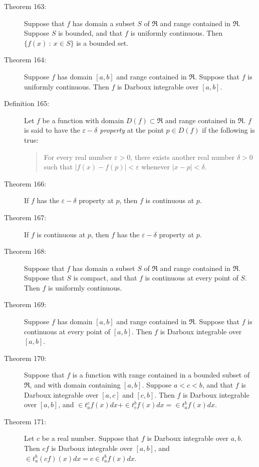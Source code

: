 \documentclass{article}
\begin{document}
\begin{description}
  \item[Theorem 163:] Suppose that $f$ has domain a subset $S$ of $\Re$ and range contained in $\Re$. Suppose $S$ is bounded, and that $f$ is uniformly continuous. Then $\{ f(x)\ :\ x \in S \}$ is a bounded set. 

  \item[Theorem 164:] Suppose $f$ has domain $[a,b]$ and range contained in $\Re$. Suppose that $f$ is uniformly continuous. Then $f$ is Darboux integrable over $[a,b]$. 

  \item[Definition 165:] Let $f$ be a function with domain $D(f) \subset \Re$ and range contained in $\Re$. $f$ is said to have the \emph{$\varepsilon-\delta$ property} at the point $p \in D(f)$ if the following is true:
    \begin{quote}
    For every real number $\varepsilon > 0$, there exists another real number $\delta > 0$ such that $|f(x)-f(p)| < \varepsilon$ whenever $|x-p| < \delta$.
    \end{quote}

  \item[Theorem 166:] If $f$ has the $\varepsilon-\delta$ property at $p$, then $f$ is continuous at $p$. 

  \item[Theorem 167:] If $f$ is continuous at $p$, then $f$ has the $\varepsilon-\delta$ property at $p$. 

  \item[Theorem 168:] Suppose that $f$ has domain a subset $S$ of $\Re$ and range contained in $\Re$. Suppose that $S$ is compact, and that $f$ is continuous at every point of $S$. Then $f$ is uniformly continuous. 

  \item[Theorem 169:] Suppose $f$ has domain $[a,b]$ and range contained in $\Re$. Suppose that $f$ is continuous at every point of $[a,b]$. Then $f$ is Darboux integrable over $[a,b]$. 

  \item[Theorem 170:] Suppose that $f$ is a function with range contained in a bounded subset of $\Re$, and with domain containing $[a,b]$. Suppose $a < c < b$, and that $f$ is Darboux integrable over $[a,c]$ and $[c,b]$. Then $f$ is Darboux integrable over $[a,b]$, and $\in t_{a}^{c} f(x) dx + \in t_{c}^{b} f(x) dx = \in t_{a}^{b} f(x) dx$. 

  \item[Theorem 171:] Let $c$ be a real number. Suppose that $f$ is Darboux integrable over $a,b$. Then $cf$ is Darboux integrable over $[a,b]$, and $\in t_{a}^{b}(cf) (x) dx = c \in t_{a}^{b} f(x) dx$. 


\end{description}
\end{document}
